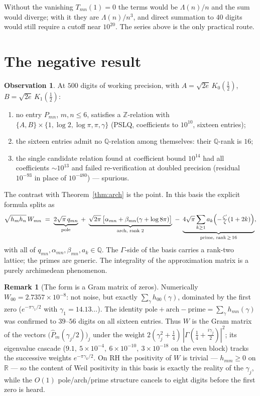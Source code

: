 \documentclass[11pt,a4paper]{article}
\theoremstyle{definition}
\newtheorem{observation}[theorem]{Observation}
\newtheorem{remark}[theorem]{Remark}
\newcommand{\R}{\mathbb{R}}
\newcommand{\Z}{\mathbb{Z}}
\newcommand{\Q}{\mathbb{Q}}
\newcommand{\G}{\Gamma}
\newcommand{\La}{\Lambda}
\begin{document}
Without the vanishing $T_{mn}(1) = 0$ the terms would be
$\La(n)/n$ and the sum would diverge; with it they are
$\La(n)/n^3$, and direct summation to $40$ digits would still
require a cutoff near $10^{20}$. The series above is the only
practical route.

\section{The negative result}

\begin{observation}\label{obs:negative}
At $500$ digits of working precision, with
$A = \sqrt{2e}\,K_0(\tfrac12)$, $B = \sqrt{2e}\,K_1(\tfrac12)$:
\begin{enumerate}
\item no entry $P_{mn}$, $m,n \le 6$, satisfies a $\Z$-relation
with $\{A, B\} \times \{1, \log 2, \log\pi, \pi, \gamma\}$
(PSLQ, coefficients to $10^{10}$, sixteen entries);
\item the sixteen entries admit no $\Q$-relation among
themselves: their $\Q$-rank is $16$;
\item the single candidate relation found at coefficient bound
$10^{14}$ had all coefficients ${\sim}10^{13}$ and failed
re-verification at doubled precision (residual $10^{-93}$ in
place of $10^{-480}$) --- spurious.
\end{enumerate}
\end{observation}

The contrast with Theorem~\ref{thm:arch} is the point. In this
basis the explicit formula splits as
\[
\sqrt{h_m h_n}\,W_{mn} \;=\;
\underbrace{2\sqrt\pi\, q_{mn}}_{\text{pole}}
\;+\; \underbrace{\sqrt{2\pi}\,\bigl[\alpha_{mn} +
   \beta_{mn}(\gamma+\log 8\pi)\bigr]}_{\text{arch, rank }2}
\;-\; \underbrace{4\sqrt\pi \sum_{k\ge1} a_k
   \Bigl(-\tfrac{\zeta'}\zeta(1+2k)\Bigr)}_{\text{prime, rank}\,\ge\,16},
\]
with all of $q_{mn}, \alpha_{mn}, \beta_{mn}, a_k \in \Q$. The
$\G$-side of the basis carries a rank-two lattice; the primes are
generic. The integrality of the approximation matrix is a purely
archimedean phenomenon.

\begin{remark}[The form is a Gram matrix of zeros]
Numerically $W_{00} = 2.7357\times10^{-8}$: not noise, but exactly
$\sum_\gamma h_{00}(\gamma)$, dominated by the first zero
($e^{-\pi\gamma_1/2}$ with $\gamma_1 = 14.13\ldots$). The identity
$\mathrm{pole} + \mathrm{arch} - \mathrm{prime} = \sum_\gamma
h_{mn}(\gamma)$ was confirmed to $39$--$56$ digits on all sixteen
entries. Thus $W$ is the Gram matrix of the vectors
$\bigl(\widehat{P}_m(\gamma_j/2)\bigr)_j$ under the weight
$2(\gamma_j^2+\tfrac14)\,|\G(\tfrac14+\tfrac{i\gamma_j}2)|^2$; its
eigenvalue cascade ($9.1,\ 5\times10^{-4},\ 6\times10^{-10},\
3\times10^{-18}$ on the even block) tracks the successive weights
$e^{-\pi\gamma_k/2}$. On RH the positivity of $W$ is trivial ---
$h_{mm} \ge 0$ on $\R$ --- so the content of Weil positivity in
this basis is exactly the reality of the $\gamma_j$, while the
$O(1)$ pole/arch/prime structure cancels to eight digits before
the first zero is heard.
\end{remark}
\end{document}
